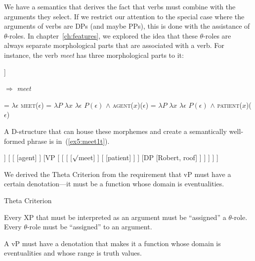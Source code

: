 We have a semantics that derives the fact that verbs must combine with the arguments they select. If we restrict our attention to the special case where the arguments of verbs are DPs (and maybe PPs), this is done with the assistance of $\theta$-roles. In chapter~\ref{ch:features}, we explored the idea that these $\theta$-roles are always separate morphological parts that are associated with a verb. For instance, the verb \emph{meet} has three morphological parts to it:%
%
%
%
\begin{exe}
	\raggedright
	\ex \label{ex5:meet1} 
	\small
	\begin{forest}
	[\obar{V}
		[$\surd$meet\\ $\theta$-role: \emph{agent}\\ $\theta$-role: \emph{patient} ]
	]
\end{forest}
\hspace*{8pt} $\Rightarrow$ \hspace*{8pt} \emph{meet}
	
\medskip
	
	\begin{xlist} 
		\ex {} = $\lambda \epsilon$ \textsc{meet}($\epsilon$)
		\ex {} = $\lambda P$ $\lambda x$ $\lambda \epsilon$ $P(\epsilon)$ $\wedge$ \textsc{agent}($x$)($\epsilon$)
		\ex {} = $\lambda P$ $\lambda x$ $\lambda \epsilon$ $P(\epsilon)$ $\wedge$ \textsc{patient}($x$)($\epsilon$)
	\end{xlist}
\end{exe}
A D-structure that can house these morphemes and create a semantically well-formed phrase is in~(\ref{ex5:meet1t}).
\begin{exe}
	\raggedright
	\ex \label{ex5:meet1t} 
	\small
	\begin{forest}
	[vP
		[DP [Jesse, roof]]
		[\ibar{v} 
			[ ]
			[VP [\ibar{V}
				[\obar{V}
					[ ]
					[\obar{v} [patient] ]
				 ]
				[DP [Robert, roof] ]
			] ]
		]
	]
	\end{forest}
\end{exe}
We derived the Theta Criterion from the requirement that vP must have a certain denotation---it must be a function whose domain is eventualities.
\begin{exe}
	\raggedright
	\ex \label{ex5:tco} Theta Criterion
	\begin{xlist}
		\ex Every XP that must be interpreted as an argument must be ``assigned'' a $\theta$-role.
		\ex Every $\theta$-role must be ``assigned'' to an argument.
	\end{xlist}
	\ex \label{ex5:vPden} A vP must have a denotation that makes it a function whose domain is eventualities and whose range is truth values.
\end{exe}
